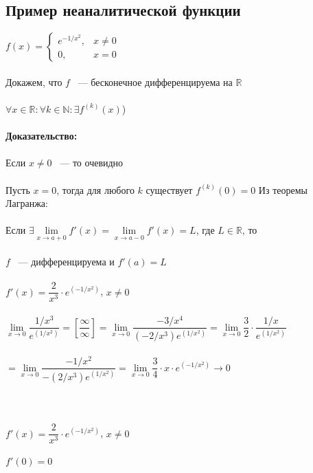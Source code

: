\documentclass[../main.tex]{subfiles}
\begin{document}
\newpage
		


\subsection{Пример неаналитической функции}
$f(x) = \begin{cases} e^{-1 / x^2}, & x \neq 0 \\ 0, & x = 0 \end{cases}$\\\\
Докажем, что $f$ ~--- бесконечное дифференцируема на $\mathbb{R}$\\\\
$\forall x \in \mathbb{R} : \forall k \in \mathbb{N} : \exists f^{(k)} (x)$)\\\\
\textbf{Доказательство:}\\\\
Если $x \neq 0$ ~--- то очевидно\\\\
Пусть $x = 0$, тогда для любого $k$ существует $f^{(k)} (0) = 0$
Из теоремы Лагранжа:\\\\
Если $\exists \lim\limits_{x \rightarrow a + 0} f'(x) = \lim\limits_{x \rightarrow a - 0} f'(x) = L$, где $L \in \mathbb{R}$, то\\\\
$f$ ~--- дифференцируема и $f'(a) = L$\\\\
$f'(x) = \dfrac{2}{x^3} \cdot e^{\left(-1 / x^2\right)}$, $x \neq 0$\\\\
$\lim\limits_{x \rightarrow 0} \dfrac{1/x^3}{e^{\left(1 / x^2\right)}} = \left[ \dfrac{\infty}{\infty} \right] = \lim\limits_{x \rightarrow 0} \dfrac{-3/x^4}{(-2/ x^3) e^{\left( 1 /x^2\right)}} = \lim\limits_{x \rightarrow 0} \dfrac{3}{2} \cdot \dfrac{1 / x}{e^{\left( 1 / x^2 \right)}}$ \\\\
$= \lim\limits_{x \rightarrow 0} \dfrac{-1 / x^2}{-(2 / x^3) e^{\left(1 / x^2\right)}} = \lim\limits_{x \rightarrow 0} \dfrac{3}{4} \cdot x \cdot e^{\left(-1 / x^2\right)} \rightarrow 0$\\\\\\\\
$f'(x) = \dfrac{2}{x^3} \cdot e^{\left(-1 / x^2\right)}$, $x \neq 0$\\\\
$f'(0) = 0$
\newpage
\end{document}
